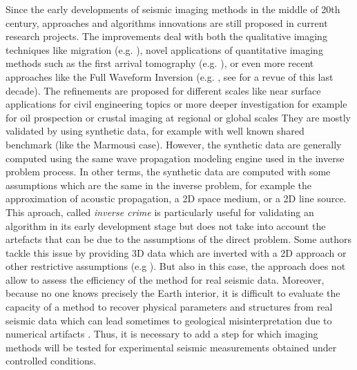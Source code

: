 \documentclass[manuscript,revised]{geophysics}
\begin{document}
\noindent Since the early developments of seismic imaging methods in the middle of 20th century, approaches and algorithms innovations are still proposed in current research projects. The improvements deal with both the qualitative imaging techniques like migration (e.g. \citet{Berkhout_MSS_2012,Guofeng_GPU_2013}), novel applications of quantitative imaging methods such as the first arrival tomography (e.g. \citet{Bohm_CWS_2015}), or even more recent approaches like the Full Waveform Inversion (e.g. \citet{Perez_AWI_2014}, see \citet{Virieux_FWI_2009} for a revue of this last decade). The refinements are proposed for different scales like near surface applications for civil engineering topics or more deeper investigation for example for oil prospection or crustal imaging at regional or global scales They are mostly validated by using synthetic data, for example with well known shared benchmark (like the Marmousi case). However, the synthetic data are generally computed using the same wave propagation modeling engine used in the inverse problem process. In other terms, the synthetic data are computed with some assumptions which are the same in the inverse problem, for example the approximation of acoustic propagation, a 2D space medium, or a 2D line source. This aproach, called \textit{inverse crime} \citep{Wirgin_TIC_2004} is particularly useful for validating an algorithm in its early development stage but does not take into account the artefacts that can be due to the assumptions of the direct problem. Some authors tackle this issue by providing 3D data which are inverted with a 2D approach or other restrictive assumptions (e.g ). But also in this case, the approach does not allow to assess the efficiency of the method for real seismic data. Moreover, because no one knows precisely the Earth interior, it is difficult to evaluate the capacity of a method to recover physical parameters and structures from real seismic data which can lead sometimes to geological misinterpretation due to numerical artifacts \citep{Morozov_ARF_2004}. Thus, it is necessary to add a step for which imaging methods will be tested for experimental seismic measurements obtained under controlled conditions.
\end{document}
